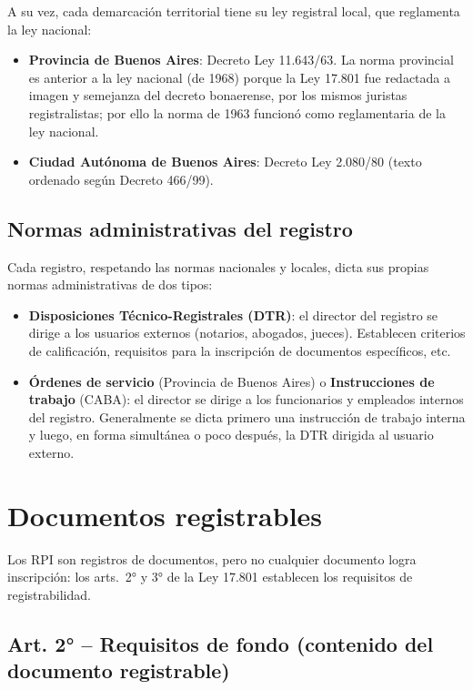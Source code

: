 \documentclass[12pt,oneside]{book}
\begin{document}
A su vez, cada demarcación territorial tiene su ley registral local, que reglamenta la ley nacional:

\begin{itemize}
    \item \textbf{Provincia de Buenos Aires}: Decreto Ley 11.643/63. La norma provincial es anterior a la ley nacional (de 1968) porque la Ley 17.801 fue redactada a imagen y semejanza del decreto bonaerense, por los mismos juristas registralistas; por ello la norma de 1963 funcionó como reglamentaria de la ley nacional.
    \item \textbf{Ciudad Autónoma de Buenos Aires}: Decreto Ley 2.080/80 (texto ordenado según Decreto 466/99).
\end{itemize}

\subsection{Normas administrativas del registro}

Cada registro, respetando las normas nacionales y locales, dicta sus propias normas administrativas de dos tipos:

\begin{itemize}
    \item \textbf{Disposiciones Técnico-Registrales (DTR)}: el director del registro se dirige a los usuarios externos (notarios, abogados, jueces). Establecen criterios de calificación, requisitos para la inscripción de documentos específicos, etc.
    \item \textbf{Órdenes de servicio} (Provincia de Buenos Aires) o \textbf{Instrucciones de trabajo} (CABA): el director se dirige a los funcionarios y empleados internos del registro. Generalmente se dicta primero una instrucción de trabajo interna y luego, en forma simultánea o poco después, la DTR dirigida al usuario externo.
\end{itemize}

\section{Documentos registrables}

Los RPI son registros de documentos, pero no cualquier documento logra inscripción: los arts.\ 2° y 3° de la Ley 17.801 establecen los requisitos de registrabilidad.

\subsection{Art. 2° -- Requisitos de fondo (contenido del documento registrable)}
\end{document}
